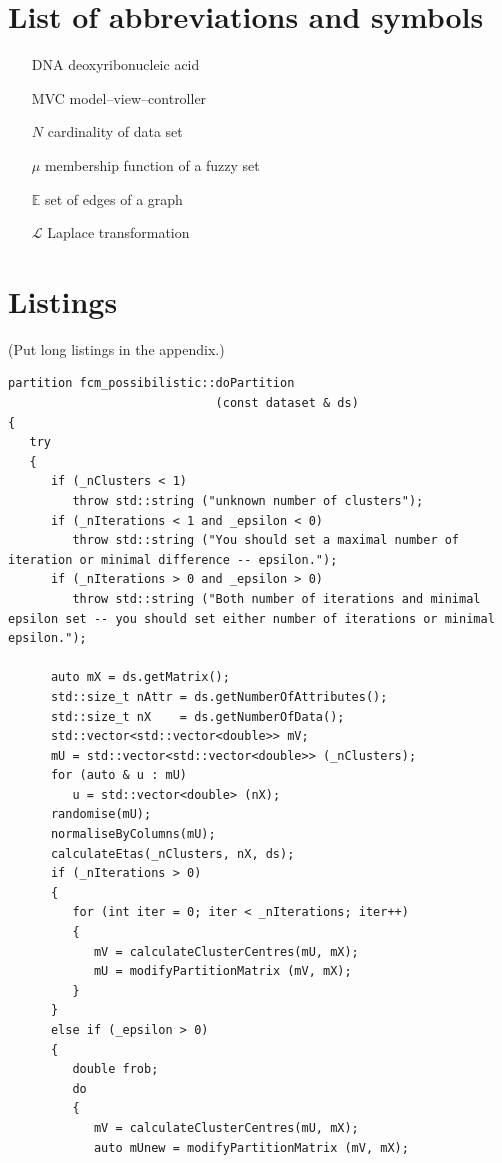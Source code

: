 \documentclass[a4paper,twoside,12pt]{book}
\newcounter{PagesWithoutNumbers}
\begin{document}
 


\backmatter
{}
\setcounter{page}{\value{PagesWithoutNumbers}}

\pagestyle{onlyPageNumbers}





\begin{appendices} 


 

\chapter*{List of abbreviations and symbols}

\begin{itemize}
\item[DNA] deoxyribonucleic acid
\item[MVC] model--view--controller 
\item[$N$] cardinality of data set
\item[$\mu$] membership function of a fuzzy set
\item[$\mathbb{E}$] set of edges of a graph
\item[$\mathcal{L}$] Laplace transformation
\end{itemize}


\chapter*{Listings}

(Put long listings in the appendix.)

\begin{lstlisting}
partition fcm_possibilistic::doPartition
                             (const dataset & ds)
{
   try
   {
      if (_nClusters < 1)
         throw std::string ("unknown number of clusters");
      if (_nIterations < 1 and _epsilon < 0)
         throw std::string ("You should set a maximal number of iteration or minimal difference -- epsilon.");
      if (_nIterations > 0 and _epsilon > 0)
         throw std::string ("Both number of iterations and minimal epsilon set -- you should set either number of iterations or minimal epsilon.");
   
      auto mX = ds.getMatrix();
      std::size_t nAttr = ds.getNumberOfAttributes();
      std::size_t nX    = ds.getNumberOfData();
      std::vector<std::vector<double>> mV;
      mU = std::vector<std::vector<double>> (_nClusters);
      for (auto & u : mU)
         u = std::vector<double> (nX);
      randomise(mU);
      normaliseByColumns(mU);
      calculateEtas(_nClusters, nX, ds);
      if (_nIterations > 0)
      {
         for (int iter = 0; iter < _nIterations; iter++)
         {
            mV = calculateClusterCentres(mU, mX);
            mU = modifyPartitionMatrix (mV, mX);
         }
      }
      else if (_epsilon > 0)
      {
         double frob;
         do 
         {
            mV = calculateClusterCentres(mU, mX);
            auto mUnew = modifyPartitionMatrix (mV, mX);
            

\end{lstlisting}
\end{appendices}
\end{document}

